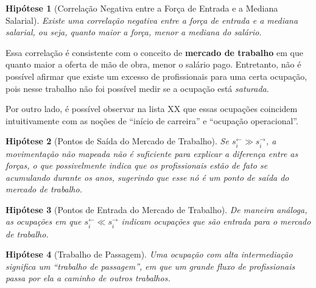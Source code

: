 \documentclass[12pt,a4paper]{article}
\theoremstyle{hypo}
\newtheorem{hypothesis}{Hipótese}
\newcommand{\linkin}[1]{#1^\leftarrow} %
\newcommand{\linkout}[1]{#1^\rightarrow} %
\begin{document}

\begin{hypothesis}[Correlação Negativa entre a Força de Entrada e a Mediana Salarial]
Existe uma correlação negativa entre a força de entrada e a mediana salarial, ou seja, quanto maior a força, menor a mediana do salário.
\end{hypothesis}

Essa correlação é consistente com o conceito de \textbf{mercado de trabalho} em que quanto maior a oferta de mão de obra, menor o salário pago. Entretanto, não é possível afirmar que existe um excesso de profissionais para uma certa ocupação, pois nesse trabalho não foi possível medir se a ocupação está \textit{saturada}. 

Por outro lado, é possível observar na lista XX que essas ocupações coincidem intuitivamente com as noções de \enquote{início de carreira} e \enquote{ocupação operacional}.

\begin{hypothesis}[Pontos de Saída do Mercado de Trabalho]
Se $\linkin{s}_i \gg \linkout{s}_i$, a movimentação não mapeada não é suficiente para explicar a diferença entre as forças, o que possivelmente indica que os profissionais estão de fato se acumulando durante os anos, sugerindo que esse nó é um ponto de saída do mercado de trabalho.
\end{hypothesis}

\begin{hypothesis}[Pontos de Entrada do Mercado de Trabalho]
De maneira análoga, as ocupações em que $\linkin{s}_i \ll \linkout{s}_i$ indicam ocupações que são entrada para o mercado de trabalho.
\end{hypothesis}

\begin{hypothesis}[Trabalho de Passagem]
Uma ocupação com alta intermediação significa um \enquote{trabalho de passagem}, em que um grande fluxo de profissionais passa por ela a caminho de outros trabalhos.
\end{hypothesis}
\end{document}
